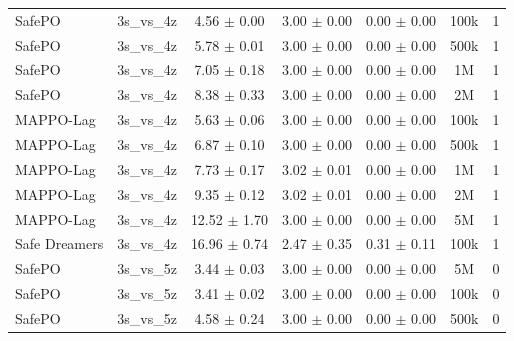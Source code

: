 \documentclass{article}
\begin{document}
\begin{longtable}{lcccccc}
SafePO & 3s\_vs\_4z & \textcolor{green!60!black}{4.56 $\pm$ 0.00} & \textcolor{green!60!black}{3.00 $\pm$ 0.00} & \textcolor{green!60!black}{0.00 $\pm$ 0.00} & 100k & 1 \\
SafePO & 3s\_vs\_4z & \textcolor{green!60!black}{5.78 $\pm$ 0.01} & \textcolor{green!60!black}{3.00 $\pm$ 0.00} & \textcolor{green!60!black}{0.00 $\pm$ 0.00} & 500k & 1 \\
SafePO & 3s\_vs\_4z & \textcolor{green!60!black}{7.05 $\pm$ 0.18} & \textcolor{green!60!black}{3.00 $\pm$ 0.00} & \textcolor{green!60!black}{0.00 $\pm$ 0.00} & 1M & 1 \\
SafePO & 3s\_vs\_4z & \textcolor{green!60!black}{8.38 $\pm$ 0.33} & \textcolor{green!60!black}{3.00 $\pm$ 0.00} & \textcolor{green!60!black}{0.00 $\pm$ 0.00} & 2M & 1 \\
MAPPO-Lag & 3s\_vs\_4z & \textcolor{green!60!black}{5.63 $\pm$ 0.06} & \textcolor{green!60!black}{3.00 $\pm$ 0.00} & \textcolor{green!60!black}{0.00 $\pm$ 0.00} & 100k & 1 \\
MAPPO-Lag & 3s\_vs\_4z & \textcolor{green!60!black}{6.87 $\pm$ 0.10} & \textcolor{green!60!black}{3.00 $\pm$ 0.00} & \textcolor{green!60!black}{0.00 $\pm$ 0.00} & 500k & 1 \\
MAPPO-Lag & 3s\_vs\_4z & \textcolor{green!60!black}{7.73 $\pm$ 0.17} & \textcolor{green!60!black}{3.02 $\pm$ 0.01} & \textcolor{green!60!black}{0.00 $\pm$ 0.00} & 1M & 1 \\
MAPPO-Lag & 3s\_vs\_4z & \textcolor{green!60!black}{9.35 $\pm$ 0.12} & \textcolor{green!60!black}{3.02 $\pm$ 0.01} & \textcolor{green!60!black}{0.00 $\pm$ 0.00} & 2M & 1 \\
MAPPO-Lag & 3s\_vs\_4z & \textcolor{green!60!black}{12.52 $\pm$ 1.70} & \textcolor{green!60!black}{3.00 $\pm$ 0.00} & \textcolor{green!60!black}{0.00 $\pm$ 0.00} & 5M & 1 \\
Safe Dreamers & 3s\_vs\_4z & 16.96 $\pm$ 0.74 & 2.47 $\pm$ 0.35 & 0.31 $\pm$ 0.11 & 100k & 1 \\
\midrule
SafePO & 3s\_vs\_5z & \textcolor{green!60!black}{3.44 $\pm$ 0.03} & \textcolor{green!60!black}{3.00 $\pm$ 0.00} & \textcolor{green!60!black}{0.00 $\pm$ 0.00} & 5M & 0 \\
SafePO & 3s\_vs\_5z & \textcolor{green!60!black}{3.41 $\pm$ 0.02} & \textcolor{green!60!black}{3.00 $\pm$ 0.00} & \textcolor{green!60!black}{0.00 $\pm$ 0.00} & 100k & 0 \\
SafePO & 3s\_vs\_5z & \textcolor{green!60!black}{4.58 $\pm$ 0.24} & \textcolor{green!60!black}{3.00 $\pm$ 0.00} & \textcolor{green!60!black}{0.00 $\pm$ 0.00} & 500k & 0 \\

\end{longtable}
\end{document}
